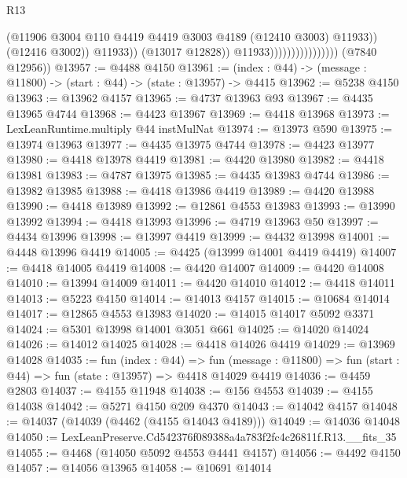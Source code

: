 \begin{lexlean}{R13}
\begin{coremodule}
                                                (@11906
                                                  @3004
                                                  @110
                                                  @4419
                                                  @4419
                                                  @3003
                                                  @4189
                                                  (@12410 @3003)
                                                  @11933))
                                              (@12416 @3002))
                                            @11933))
                                        (@13017 @12828))
                                      @11933))))))))))))))))
      (@7840 @12956))
@13957 := @4488 @4150
@13961 := (index : @44) -> (message : @11800) -> (start : @44) -> (state : @13957) -> @4415
@13962 := @5238 @4150
@13963 := @13962 @4157
@13965 := @4737 @13963 @93
@13967 := @4435 @13965 @4744
@13968 := @4423 @13967
@13969 := @4418 @13968
@13973 := LexLeanRuntime.multiply @44 instMulNat
@13974 := @13973 @590
@13975 := @13974 @13963
@13977 := @4435 @13975 @4744
@13978 := @4423 @13977
@13980 := @4418 @13978 @4419
@13981 := @4420 @13980
@13982 := @4418 @13981
@13983 := @4787 @13975
@13985 := @4435 @13983 @4744
@13986 := @13982 @13985
@13988 := @4418 @13986 @4419
@13989 := @4420 @13988
@13990 := @4418 @13989
@13992 := @12861 @4553 @13983
@13993 := @13990 @13992
@13994 := @4418 @13993
@13996 := @4719 @13963 @50
@13997 := @4434 @13996
@13998 := @13997 @4419
@13999 := @4432 @13998
@14001 := @4448 @13996 @4419
@14005 := @4425 (@13999 @14001 @4419 @4419)
@14007 := @4418 @14005 @4419
@14008 := @4420 @14007
@14009 := @4420 @14008
@14010 := @13994 @14009
@14011 := @4420 @14010
@14012 := @4418 @14011
@14013 := @5223 @4150
@14014 := @14013 @4157
@14015 := @10684 @14014
@14017 := @12865 @4553 @13983
@14020 := @14015 @14017 @5092 @3371
@14024 := @5301 @13998 @14001 @3051 @661
@14025 := @14020 @14024
@14026 := @14012 @14025
@14028 := @4418 @14026 @4419
@14029 := @13969 @14028
@14035 := fun (index : @44) =>
  fun (message : @11800) => fun (start : @44) => fun (state : @13957) => @4418 @14029 @4419
@14036 := @4459 @2803
@14037 := @4155 @11948
@14038 := @156 @4553
@14039 := @4155 @14038
@14042 := @5271 @4150 @209 @4370
@14043 := @14042 @4157
@14048 := @14037 (@14039 (@4462 (@4155 @14043 @4189)))
@14049 := @14036 @14048
@14050 := LexLeanPreserve.Cd542376f089388a4a783f2fc4c26811f.R13.__fits_35
@14055 := @4468 (@14050 @5092 @4553 @4441 @4157)
@14056 := @4492 @4150
@14057 := @14056 @13965
@14058 := @10691 @14014

\end{coremodule}
\end{lexlean}
